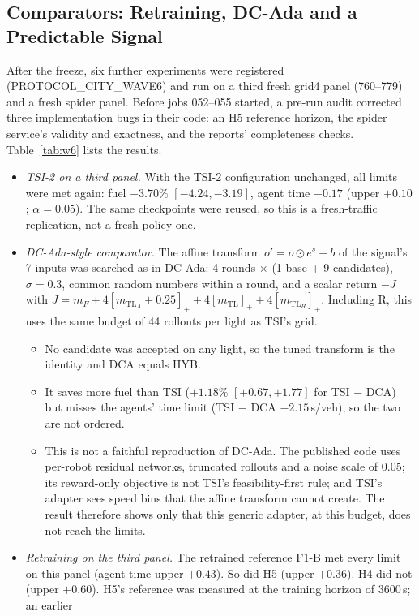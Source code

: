 \subsection{Comparators: Retraining, DC-Ada and a Predictable Signal}\label{sec:comp}\label{sec:w6}
After the freeze, six further experiments were registered (PROTOCOL\_CITY\_WAVE6) and run on a third fresh grid4 panel (760--779) and a
fresh spider panel. Before jobs 052--055 started, a pre-run audit corrected three implementation bugs in their code: an H5 reference
horizon, the spider service's validity and exactness, and the reports' completeness checks. Table~\ref{tab:w6} lists the results.
\begin{itemize}
\item \emph{TSI-2 on a third panel.} With the TSI-2 configuration unchanged, all limits were met again: fuel $-3.70\%$ $[-4.24,-3.19]$,
agent time $-0.17$ (upper $+0.10$; $\alpha=0.05$). The same checkpoints were reused, so this is a fresh-traffic replication, not a
fresh-policy one.
\item \emph{DC-Ada-style comparator.} The affine transform $o'=o\odot e^{s}+b$ of the signal's 7 inputs was searched as in DC-Ada:
4 rounds $\times$ (1 base + 9 candidates), $\sigma=0.3$, common random numbers within a round, and a scalar return
$-J$ with $J=m_F+4[m_{\mathrm{TL}_A}+0.25]_++4[m_{\mathrm{TL}}]_++4[m_{\mathrm{TL}_H}]_+$. Including R, this uses the same budget of 44
rollouts per light as TSI's grid.
\begin{itemize}\setlength\itemsep{0pt}
\item No candidate was accepted on any light, so the tuned transform is the identity and DCA equals HYB.
\item It saves more fuel than TSI ($+1.18\%$ $[+0.67,+1.77]$ for TSI $-$ DCA) but misses the agents' time limit (TSI $-$ DCA $-2.15$\,s/veh),
so the two are not ordered.
\item This is not a faithful reproduction of DC-Ada. The published code uses per-robot residual networks, truncated rollouts and a noise scale
of 0.05; its reward-only objective is not TSI's feasibility-first rule; and TSI's adapter sees speed bins that the affine transform cannot
create. The result therefore shows only that this generic adapter, at this budget, does not reach the limits.
\end{itemize}
\item \emph{Retraining on the third panel.} The retrained reference F1-B met every limit on this panel (agent time upper $+0.43$). So did
H5 (upper $+0.36$). H4 did not (upper $+0.60$). H5's reference was measured at the training horizon of 3600\,s; an earlier

\end{itemize}

